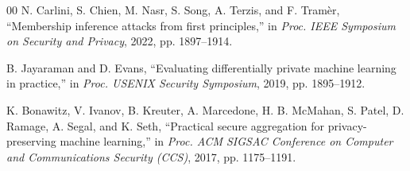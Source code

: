 \documentclass[conference]{IEEEtran}
\begin{document}
\begin{thebibliography}{00}
N. Carlini, S. Chien, M. Nasr, S. Song, A. Terzis, and F. Tram\`er, ``Membership
inference attacks from first principles,'' in \textit{Proc. IEEE Symposium on
Security and Privacy}, 2022, pp. 1897--1914.

B. Jayaraman and D. Evans, ``Evaluating differentially private machine learning
in practice,'' in \textit{Proc. USENIX Security Symposium}, 2019, pp. 1895--1912.

K. Bonawitz, V. Ivanov, B. Kreuter, A. Marcedone, H. B. McMahan, S. Patel, D.
Ramage, A. Segal, and K. Seth, ``Practical secure aggregation for
privacy-preserving machine learning,'' in \textit{Proc. ACM SIGSAC Conference on
Computer and Communications Security (CCS)}, 2017, pp. 1175--1191.

\end{thebibliography}
\end{document}
